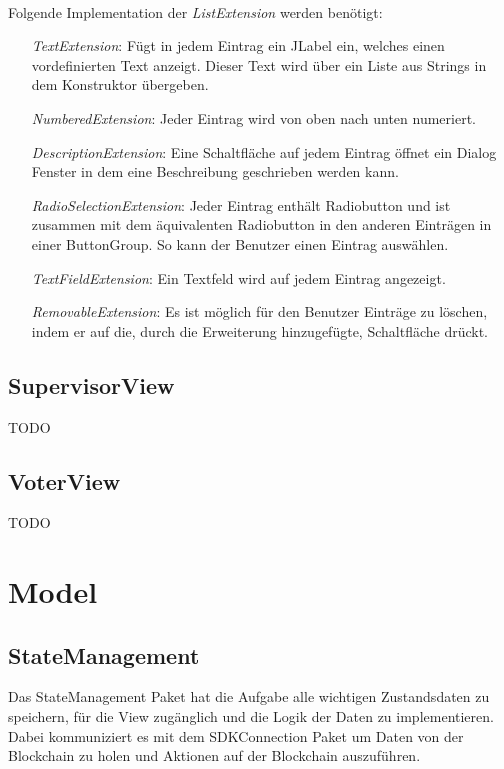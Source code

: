 \documentclass[parskip=full]{scrartcl}
\begin{document}
		\\
		Folgende Implementation der \textit{ListExtension} werden benötigt:
		\begin{itemize}
			\item[\textit{TextExtension}:] Fügt in jedem Eintrag ein JLabel ein, welches einen vordefinierten Text anzeigt. Dieser Text wird über ein Liste aus Strings in dem Konstruktor übergeben.
			\item[\textit{NumberedExtension}:] Jeder Eintrag wird von oben nach unten numeriert.
			\item[\textit{DescriptionExtension}:] Eine Schaltfläche auf jedem Eintrag öffnet ein Dialog Fenster in dem eine Beschreibung geschrieben werden kann.
			\item[\textit{RadioSelectionExtension}:] Jeder Eintrag enthält Radiobutton und ist zusammen mit dem äquivalenten Radiobutton in den anderen Einträgen in einer ButtonGroup. So kann der Benutzer einen Eintrag auswählen.
			\item[\textit{TextFieldExtension}:] Ein Textfeld wird auf jedem Eintrag angezeigt.
			\item[\textit{RemovableExtension}:] Es ist möglich für den Benutzer Einträge zu löschen, indem er auf die, durch die Erweiterung hinzugefügte, Schaltfläche drückt.
		\end{itemize}
	
		\subsection{SupervisorView}
		TODO
		
		\subsection{VoterView}
		TODO
	
	\section{Model}
	\subsection{StateManagement}
	Das StateManagement Paket hat die Aufgabe alle wichtigen Zustandsdaten zu speichern, für die View zugänglich und die Logik der Daten zu implementieren.
	Dabei kommuniziert es mit dem SDKConnection Paket um Daten von der Blockchain zu holen und Aktionen auf der Blockchain auszuführen.
	
\end{document}

